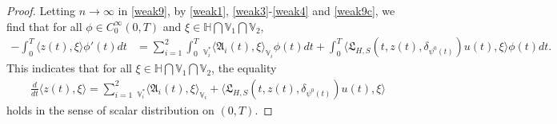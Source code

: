 \documentclass[11pt]{article}
\numberwithin{equation}{section}
\begin{document}
\begin{proof}
Letting $n\rightarrow\infty$ in \eqref{weak9},
by \eqref{weak1}, \eqref{weak3}-\eqref{weak4} and \eqref{weak9c}, we find that for all
$\phi\in C_0^\infty(0,T)$
and $\xi\in \mathbb{H}\bigcap\mathbb{V}_1
\bigcap\mathbb{V}_2$,
\begin{align*}
-\int_0^T\langle z(t) ,\xi\rangle\phi'(t)dt
&=\sum_{i=1}^2
 \int_{0}^T\ _{\mathbb{V}_i^*}\big\langle \mathfrak{A}_i(t),
\xi\big  \rangle_{\mathbb{V}_i}  \phi(t)      dt
 +\int_{0}^T
 \big\langle \mathfrak{L}_{H,S}(t,z(t),
\delta_{\psi^0(t)})u(t),\xi \big\rangle\phi(t) dt.
\end{align*}
This indicates that for all $\xi\in \mathbb{H}\bigcap\mathbb{V}_1
\bigcap\mathbb{V}_2$, the equality
\begin{align}\label{weak10}
\frac{d}{dt} \langle z(t) ,\xi\rangle
=\sum_{i=1}^2
\ _{\mathbb{V}_i^*}\big\langle \mathfrak{A}_i(t),
\xi\big  \rangle_{\mathbb{V}_i}
 +\big\langle \mathfrak{L}_{H,S}(t,z(t),
\delta_{\psi^0(t)})u(t),\xi \big\rangle
\end{align}
holds in the sense of scalar distribution on $(0,T)$.


\end{proof}
\end{document}
